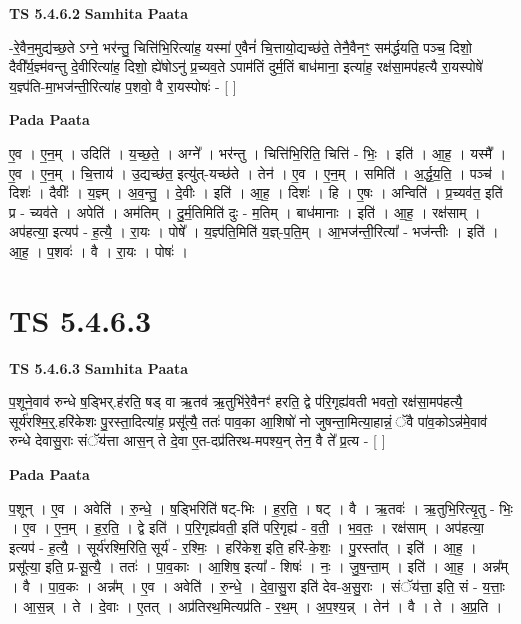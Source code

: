 \documentclass[17pt]{extarticle}
\begin{document}
\textbf{TS 5.4.6.2 } \newline
\textbf{Samhita Paata} \newline

-रे॒वैन॒मुद्य॑च्छ॒ते ऽग्ने॒ भर॑न्तु॒ चित्ति॑भि॒रित्या॑ह॒ यस्मा॑ ए॒वैनं॑ चि॒त्तायो॒द्यच्छ॑ते॒ तेनै॒वैनꣳ॒॒ सम॑र्द्धयति॒ पञ्च॒ दिशो॒ दैवी᳚र्य॒ज्ञ्म॑वन्तु दे॒वीरित्या॑ह॒ दिशो॒ ह्ये॑षोऽनु॑ प्र॒च्यव॒ते ऽपाम॑तिं दुर्म॒तिं बाध॑माना॒ इत्या॑ह॒ रक्ष॑सा॒मप॑हत्यै रा॒यस्पोषे॑ य॒ज्ञ्प॑ति-मा॒भज॑न्ती॒रित्या॑ह प॒शवो॒ वै रा॒यस्पोषः॑ - [  ] \newline

\textbf{Pada Paata} \newline

ए॒व । ए॒न॒म् । उदिति॑ । य॒च्छ॒ते॒ । अग्ने᳚ । भर॑न्तु । चित्ति॑भि॒रिति॒ चित्ति॑ - भिः॒ । इति॑ । आ॒ह॒ । यस्मै᳚ । ए॒व । ए॒न॒म् । चि॒त्ताय॑ । उ॒द्यच्छ॑त॒ इत्यु॑त्-यच्छ॑ते । तेन॑ । ए॒व । ए॒न॒म् । समिति॑ । अ॒र्द्ध॒य॒ति॒ । पञ्च॑ । दिशः॑ । दैवीः᳚ । य॒ज्ञ्म् । अ॒व॒न्तु॒ । दे॒वीः । इति॑ । आ॒ह॒ । दिशः॑ । हि । ए॒षः । अन्विति॑ । प्र॒च्यव॑त॒ इति॑ प्र - च्यव॑ते । अपेति॑ । अम॑तिम् । दु॒र्म॒तिमिति॑ दुः - म॒तिम् । बाध॑मानाः । इति॑ । आ॒ह॒ । रक्ष॑साम् । अप॑हत्या॒ इत्यप॑ - ह॒त्यै॒ । रा॒यः । पोषे᳚ । य॒ज्ञ्प॑ति॒मिति॑ य॒ज्ञ्-प॒ति॒म् । आ॒भज॑न्ती॒रित्या᳚ - भज॑न्तीः । इति॑ । आ॒ह॒ । प॒शवः॑ । वै । रा॒यः । पोषः॑ ।  \newline





\section{ TS 5.4.6.3 }

\textbf{TS 5.4.6.3 } \newline
\textbf{Samhita Paata} \newline

प॒शूने॒वाव॑ रुन्धे ष॒ड्भिर्.ह॑रति॒ षड् वा ऋ॒तव॑ ऋ॒तुभि॑रे॒वैनꣳ॑ हरति॒ द्वे प॑रि॒गृह्य॑वती भवतो॒ रक्ष॑सा॒मप॑हत्यै॒ सूर्य॑रश्मि॒र्॒.हरि॑केशः पु॒रस्ता॒दित्या॑ह॒ प्रसू᳚त्यै॒ ततः॑ पाव॒का आ॒शिषो॑ नो जुषन्ता॒मित्या॒हान्नं॒ ॅवै पा॑व॒कोऽन्न॑मे॒वाव॑ रुन्धे देवासु॒राः संॅय॑त्ता आस॒न् ते दे॒वा ए॒त-दप्र॑तिरथ-मपश्य॒न् तेन॒ वै ते᳚ प्र॒त्य - [  ] \newline

\textbf{Pada Paata} \newline

प॒शून् । ए॒व । अवेति॑ । रु॒न्धे॒ । ष॒ड्भिरिति॑ षट्-भिः । ह॒र॒ति॒ । षट् । वै । ऋ॒तवः॑ । ऋ॒तुभि॒रित्यृ॒तु - भिः॒ । ए॒व । ए॒न॒म् । ह॒र॒ति॒ । द्वे इति॑ । प॒रि॒गृह्य॑वती॒ इति॑ परि॒गृह्य॑ - व॒ती॒ । भ॒व॒तः॒ । रक्ष॑साम् । अप॑हत्या॒ इत्यप॑ - ह॒त्यै॒ । सूर्य॑रश्मि॒रिति॒ सूर्य॑ - र॒श्मिः॒ । हरि॑केश॒ इति॒ हरि॑-के॒शः॒ । पु॒रस्ता᳚त् । इति॑ । आ॒ह॒ । प्रसू᳚त्या॒ इति॒ प्र-सू॒त्यै॒ । ततः॑ । पा॒व॒काः । आ॒शिष॒ इत्या᳚ - शिषः॑ । नः॒ । जु॒ष॒न्ता॒म् । इति॑ । आ॒ह॒ । अन्न᳚म् । वै । पा॒व॒कः । अन्न᳚म् । ए॒व । अवेति॑ । रु॒न्धे॒ । दे॒वा॒सु॒रा इति॑ देव-अ॒सु॒राः । संॅय॑त्ता॒ इति॒ सं - य॒त्ताः॒ । आ॒स॒न्न् । ते । दे॒वाः । ए॒तत् । अप्र॑तिरथ॒मित्यप्र॑ति - र॒थ॒म् । अ॒प॒श्य॒न्न् । तेन॑ । वै । ते । अ॒प्र॒ति ।  \newline
\end{document}
